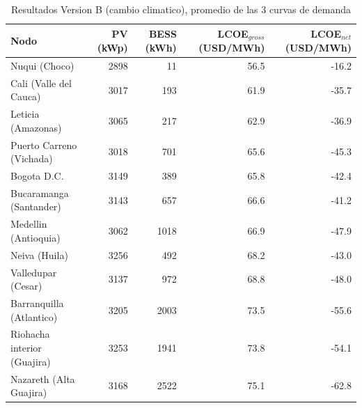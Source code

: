 \begin{table}[htbp]
\centering
\caption{Resultados Version B (cambio climatico), promedio de las 3 curvas de demanda}
\label{tab:versionB}
\begin{tabular}{lrrrr}
\toprule
Nodo & PV (kWp) & BESS (kWh) & LCOE$_{gross}$ (USD/MWh) & LCOE$_{net}$ (USD/MWh) \\ \midrule
Nuqui (Choco) & 2898 & 11 & 56.5 & -16.2 \\
Cali (Valle del Cauca) & 3017 & 193 & 61.9 & -35.7 \\
Leticia (Amazonas) & 3065 & 217 & 62.9 & -36.9 \\
Puerto Carreno (Vichada) & 3018 & 701 & 65.6 & -45.3 \\
Bogota D.C. & 3149 & 389 & 65.8 & -42.4 \\
Bucaramanga (Santander) & 3143 & 657 & 66.6 & -41.2 \\
Medellin (Antioquia) & 3062 & 1018 & 66.9 & -47.9 \\
Neiva (Huila) & 3256 & 492 & 68.2 & -43.0 \\
Valledupar (Cesar) & 3137 & 972 & 68.8 & -48.0 \\
Barranquilla (Atlantico) & 3205 & 2003 & 73.5 & -55.6 \\
Riohacha interior (Guajira) & 3253 & 1941 & 73.8 & -54.1 \\
Nazareth (Alta Guajira) & 3168 & 2522 & 75.1 & -62.8 \\
\bottomrule
\end{tabular}
\end{table}